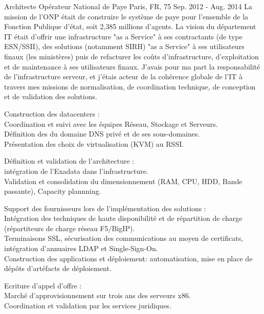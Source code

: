 \begin{cventries}
  \cventry
    {Architecte} %
    {Opérateur National de Paye} %
    {Paris, FR, 75} %
    {Sep. 2012 - Aug. 2014} %
{
La mission de l'ONP était de construire le système de paye pour l'ensemble de la Fonction Publique d'état, soit 2,385 millions d'agents. La vision du département IT était d'offrir une infrastructure "as a Service" à ses contractants (de type ESN/SSII), des solutions (notamment SIRH) "as a Service" à ses utilisateurs finaux (les ministères) puis de refacturer les coûts d'infrastructure, d'exploitation et de maintenance à ses utilisateurs finaux.
J'avais pour ma part la responsabilité de l'infrastructure serveur, et j'étais acteur de la cohérence globale de l'IT à travers mes missions de normalisation, de coordination technique, de conception et de validation des solutions.
} %
{
      \begin{cvitems} %
        \item {Construction des datacenters :\\Coordination et suivi avec les équipes Réseau, Stockage et Serveurs.\\Définition des du domaine DNS privé et de ses sous-domaines.\\Présentation des choix de virtualisation (KVM) au RSSI.}
        \item {Définition et validation de l'architecture :\\intégration de l'Exadata dans l'infrastructure.\\Validation et consolidation du dimensionnement (RAM, CPU, HDD, Bande passante), Capacity plannning.}
        \item {Support des fournisseurs lors de l'implémentation des solutions :\\Intégration des techniques de haute disponibilité et de répartition de charge (répartiteurs de charge réseau F5/BigIP).\\Terminaisons SSL, sécurisation des communications au moyen de certificats, intégration d'annuaires LDAP et Single-Sign-On.\\Construction des applications et déploiement: automatisation, mise en place de dépôts d'artéfacts de déploiement.}
        \item {Ecriture d'appel d'offre :\\Marché d'approvisionnement sur trois ans des serveurs x86.\\Coordination et validation par les services juridiques.}
      \end{cvitems}
} %


\end{cventries}
